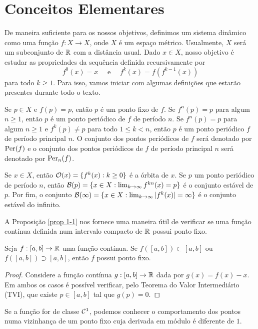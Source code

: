 \section{Conceitos Elementares}

De maneira suficiente para os nossos objetivos, definimos um sistema dinâmico como uma função $f: X \to X$, onde $X$ é um espaço métrico.
Usualmente, $X$ será um subconjunto de $\mathbb{R}$ com a distância usual.
Dado $x \in X$, nosso objetivo é estudar as propriedades da sequência definida recursivamente por
$$f^0(x) = x \quad \text{ e } \quad f^k(x) = f(f^{k-1}(x))$$
para todo $k \geq 1$. Para isso, vamos iniciar com algumas definições que estarão presentes durante todo o texto.

Se $p \in X$ e $f(p) = p$, então $p$ é um ponto fixo de $f$.
Se $f^n(p) = p$ para algum $n \geq 1$, então $p$ é um ponto periódico de $f$ de período $n$.
Se $f^n(p) = p$ para algum $n \geq 1$ e $f^k(p) \neq p$ para todo $1 \leq k < n$, então $p$ é um ponto periódico $f$ de período principal $n$.
O conjunto dos pontos periódicos de $f$ será denotado por $\operatorname{Per}(f)$ e o conjunto dos pontos periódicos de $f$ de período principal $n$ será denotado por $\operatorname{Per}_n(f)$.

Se $x \in X$, então $\mathcal{O}(x) = \lbrace f^k(x) : k \geq 0 \rbrace$ é a órbita de $x$.
Se $p$ um ponto periódico de período $n$, então $\mathcal{B}(p) = \lbrace x \in  X: \lim_{k \to \infty} f^{kn}(x) = p \rbrace$ é o conjunto estável de $p$.
Por fim, o conjunto $\mathcal{B}(\infty) = \lbrace x \in  X: \lim_{k \to \infty} |f^k(x)| = \infty \rbrace$ é o conjunto estável do infinito.

A Proposição \ref{prop 1-1} nos fornece uma maneira útil de verificar se uma função contínua definida num intervalo compacto de $\mathbb{R}$ possui ponto fixo.

\begin{proposition}\label{prop 1-1}
Seja $f: [a, b] \to \mathbb{R}$ uma função contínua. Se $f([a, b]) \subset [a, b]$ ou $f([a, b]) \supset [a, b]$, então $f$ possui ponto fixo.
\end{proposition}

\begin{proof}
Considere a função contínua $g: [a, b] \to \mathbb{R}$ dada por $g(x) = f(x) - x$. Em ambos os casos é possível verificar, pelo Teorema do Valor Intermediário (TVI), que existe $p \in [a, b]$ tal que $g(p) = 0$.
\end{proof}

Se a função for de classe $\mathcal{C}^1$, podemos conhecer o comportamento dos pontos numa vizinhança de um ponto fixo cuja derivada em módulo é diferente de $1$.

